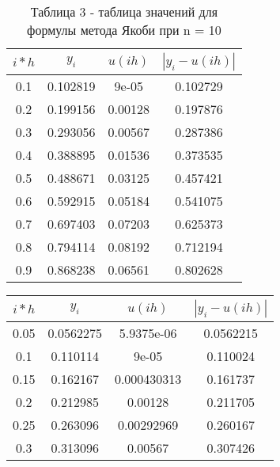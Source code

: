 \documentclass[a4paper,12pt]{article}
\begin{document}
{\begin{enumerate}[label = \arabic*.]
{        \begin{table}[h]
          \centering
          \begin{tabular}{|c|c|c|c|}
            \hline
            $i*h$ & $y_i$ & $u(ih)$ & $\left|y_i-u(ih)\right|$\\
            \hline
            0.1 &     0.102819 &        9e-05 &     0.102729\\
            \hline
            0.2 &     0.199156 &      0.00128 &     0.197876\\
            \hline
            0.3 &     0.293056 &      0.00567 &     0.287386\\
            \hline
            0.4 &     0.388895 &      0.01536 &     0.373535\\
            \hline
            0.5 &     0.488671 &      0.03125 &     0.457421\\
            \hline
            0.6 &     0.592915 &      0.05184 &     0.541075\\
            \hline
            0.7 &     0.697403 &      0.07203 &     0.625373\\
            \hline
            0.8 &     0.794114 &      0.08192 &     0.712194\\
            \hline
            0.9 &     0.868238 &      0.06561 &     0.802628\\
            \hline
          \end{tabular}
          \caption*{\small{Таблица 3 - таблица значений для формулы метода Якоби при n = 10}}
        \end{table}
        \begin{table}[h]
            \centering
            \begin{tabular}{|c|c|c|c|}
                \hline
                $i*h$ & $y_i$ & $u(ih)$ & $\left|y_i-u(ih)\right|$\\
                \hline
                0.05 &    0.0562275 &   5.9375e-06 &    0.0562215\\
                \hline
                0.1 &     0.110114 &        9e-05 &     0.110024\\
                \hline
                0.15 &     0.162167 &  0.000430313 &     0.161737\\
                \hline
                0.2 &     0.212985 &      0.00128 &     0.211705\\
                \hline
                0.25 &     0.263096 &   0.00292969 &     0.260167\\
                \hline
                0.3 &     0.313096 &      0.00567 &     0.307426\\

\end{tabular}
\end{table}}
\end{enumerate}}
\end{document}
